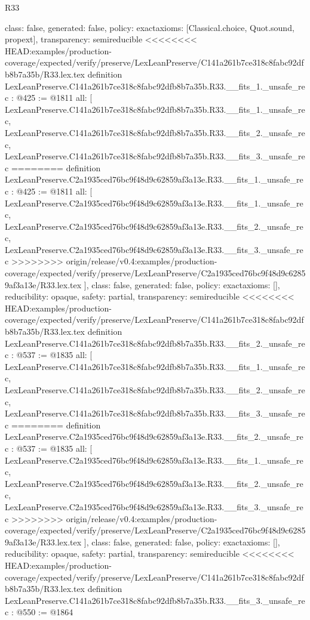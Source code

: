 \begin{lexlean}{R33}
\begin{coremodule}
{{{{{{{{{{{{{{{  class: false,
  generated: false,
  policy: exact{axioms: [Classical.choice, Quot.sound, propext]},
  transparency: semireducible
}
<<<<<<<< HEAD:examples/production-coverage/expected/verify/preserve/LexLeanPreserve/C141a261b7ce318c8fabc92dfb8b7a35b/R33.lex.tex
definition LexLeanPreserve.C141a261b7ce318c8fabc92dfb8b7a35b.R33.__fits_1._unsafe_rec : @425 := @1811 {
  all: [
    LexLeanPreserve.C141a261b7ce318c8fabc92dfb8b7a35b.R33.__fits_1._unsafe_rec,
    LexLeanPreserve.C141a261b7ce318c8fabc92dfb8b7a35b.R33.__fits_2._unsafe_rec,
    LexLeanPreserve.C141a261b7ce318c8fabc92dfb8b7a35b.R33.__fits_3._unsafe_rec
========
definition LexLeanPreserve.C2a1935ced76bc9f48d9c62859af3a13e.R33.__fits_1._unsafe_rec : @425 := @1811 {
  all: [
    LexLeanPreserve.C2a1935ced76bc9f48d9c62859af3a13e.R33.__fits_1._unsafe_rec,
    LexLeanPreserve.C2a1935ced76bc9f48d9c62859af3a13e.R33.__fits_2._unsafe_rec,
    LexLeanPreserve.C2a1935ced76bc9f48d9c62859af3a13e.R33.__fits_3._unsafe_rec
>>>>>>>> origin/release/v0.4:examples/production-coverage/expected/verify/preserve/LexLeanPreserve/C2a1935ced76bc9f48d9c62859af3a13e/R33.lex.tex
  ],
  class: false,
  generated: false,
  policy: exact{axioms: []},
  reducibility: opaque{},
  safety: partial,
  transparency: semireducible
}
<<<<<<<< HEAD:examples/production-coverage/expected/verify/preserve/LexLeanPreserve/C141a261b7ce318c8fabc92dfb8b7a35b/R33.lex.tex
definition LexLeanPreserve.C141a261b7ce318c8fabc92dfb8b7a35b.R33.__fits_2._unsafe_rec : @537 := @1835 {
  all: [
    LexLeanPreserve.C141a261b7ce318c8fabc92dfb8b7a35b.R33.__fits_1._unsafe_rec,
    LexLeanPreserve.C141a261b7ce318c8fabc92dfb8b7a35b.R33.__fits_2._unsafe_rec,
    LexLeanPreserve.C141a261b7ce318c8fabc92dfb8b7a35b.R33.__fits_3._unsafe_rec
========
definition LexLeanPreserve.C2a1935ced76bc9f48d9c62859af3a13e.R33.__fits_2._unsafe_rec : @537 := @1835 {
  all: [
    LexLeanPreserve.C2a1935ced76bc9f48d9c62859af3a13e.R33.__fits_1._unsafe_rec,
    LexLeanPreserve.C2a1935ced76bc9f48d9c62859af3a13e.R33.__fits_2._unsafe_rec,
    LexLeanPreserve.C2a1935ced76bc9f48d9c62859af3a13e.R33.__fits_3._unsafe_rec
>>>>>>>> origin/release/v0.4:examples/production-coverage/expected/verify/preserve/LexLeanPreserve/C2a1935ced76bc9f48d9c62859af3a13e/R33.lex.tex
  ],
  class: false,
  generated: false,
  policy: exact{axioms: []},
  reducibility: opaque{},
  safety: partial,
  transparency: semireducible
}
<<<<<<<< HEAD:examples/production-coverage/expected/verify/preserve/LexLeanPreserve/C141a261b7ce318c8fabc92dfb8b7a35b/R33.lex.tex
definition LexLeanPreserve.C141a261b7ce318c8fabc92dfb8b7a35b.R33.__fits_3._unsafe_rec : @550 := @1864 {
}}}}}}}}}}}}}}}}}
\end{coremodule}
\end{lexlean}
